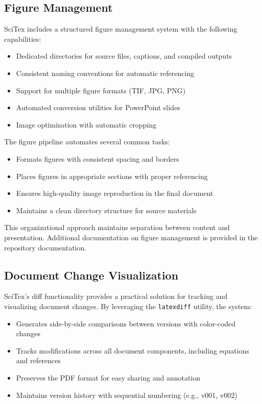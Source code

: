 \subsection{Figure Management}
\label{subsec:figures}

SciTex includes a structured figure management system with the following capabilities:

\begin{itemize}
    \item Dedicated directories for source files, captions, and compiled outputs
    \item Consistent naming conventions for automatic referencing
    \item Support for multiple figure formats (TIF, JPG, PNG)
    \item Automated conversion utilities for PowerPoint slides
    \item Image optimization with automatic cropping
\end{itemize}


The figure pipeline automates several common tasks:

\begin{itemize}
    \item Formats figures with consistent spacing and borders
    \item Places figures in appropriate sections with proper referencing
    \item Ensures high-quality image reproduction in the final document
    \item Maintains a clean directory structure for source materials
\end{itemize}

This organizational approach maintains separation between content and presentation. Additional documentation on figure management is provided in the repository documentation.

\subsection{Document Change Visualization}
\label{subsec:diff-visualization}

SciTex's diff functionality provides a practical solution for tracking and visualizing document changes. By leveraging the \texttt{latexdiff} utility, the system:

\begin{itemize}
    \item Generates side-by-side comparisons between versions with color-coded changes
    \item Tracks modifications across all document components, including equations and references
    \item Preserves the PDF format for easy sharing and annotation
    \item Maintains version history with sequential numbering (e.g., v001, v002)
\end{itemize}

